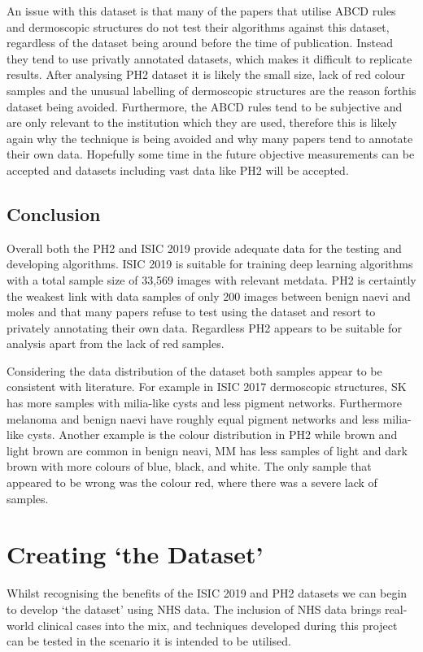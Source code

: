 An issue with this dataset is that many of the papers that utilise ABCD rules and dermoscopic structures do not test their algorithms against this dataset, regardless of the dataset being around before the time of publication\cite{Kasmi2016, She2007, Tenenhaus2010, Ramezani2014, Zaqout2016}. Instead they tend to use privatly annotated datasets, which makes it difficult to replicate results. After analysing PH2 dataset it is likely the small size, lack of red colour samples and the unusual labelling of dermoscopic structures are the reason forthis dataset being avoided. Furthermore, the ABCD rules tend to be subjective and are only relevant to the institution which they are used, therefore this is likely again why the technique is being avoided and why many papers tend to annotate their own data. Hopefully some time in the future objective measurements can be accepted and datasets including vast data like PH2 will be accepted.

\section{Conclusion}
Overall both the PH2 and ISIC 2019 provide adequate data for the testing and developing algorithms. ISIC 2019 is suitable for training deep learning algorithms with a total sample size of 33,569 images with relevant metdata. PH2 is certaintly the weakest link with data samples of only 200 images between benign naevi and moles and that many papers refuse to test using the dataset and resort to privately annotating their 
own data. Regardless PH2 appears to be suitable for analysis apart from the lack of red samples.

Considering the data distribution of the dataset both samples appear to be consistent with literature. For example in ISIC 2017 dermoscopic structures, SK has more samples with milia-like cysts and less pigment networks. Furthermore melanoma and benign naevi have roughly equal pigment networks and less milia-like cysts. Another example is the colour distribution in PH2 while brown and light brown are common in benign neavi, MM has less samples of light and dark brown with more colours of blue, black, and white. The only sample that appeared to be wrong was the colour red, where there was a severe lack of samples.

\chapter{Creating `the Dataset'}
Whilst recognising the benefits of the ISIC 2019 and PH2 datasets we can begin to develop `the dataset' using NHS data. The inclusion of NHS data brings real-world clinical cases into the mix, and techniques developed during this project can be tested in the scenario it is intended to be utilised.

